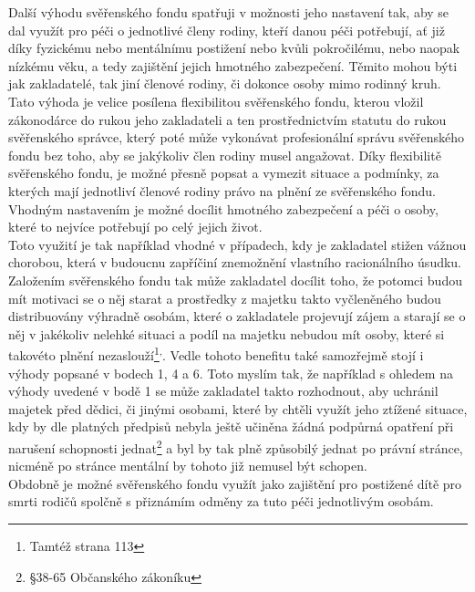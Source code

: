 \documentclass{article}
\begin{document}
 Další výhodu svěřenského fondu spatřuji v možnosti jeho nastavení tak, aby se dal využít pro péči o jednotlivé členy rodiny, kteří danou péči potřebují, ať již díky fyzickému nebo mentálnímu postižení nebo kvůli pokročilému, nebo naopak nízkému věku, a tedy zajištění jejich hmotného zabezpečení. Těmito mohou býti jak zakladatelé, tak jiní členové rodiny, či dokonce osoby mimo rodinný kruh. Tato výhoda je velice posílena flexibilitou svěřenského fondu, kterou vložil zákonodárce do rukou jeho zakladateli a ten prostřednictvím statutu do rukou svěřenského správce, který poté může vykonávat profesionální správu svěřenského fondu bez toho, aby se jakýkoliv člen rodiny musel angažovat. Díky flexibilitě svěřenského fondu, je možné přesně popsat a vymezit situace a podmínky, za kterých mají jednotliví členové rodiny právo na plnění ze svěřenského fondu. Vhodným nastavením je možné docílit hmotného zabezpečení a péči o osoby, které to nejvíce potřebují po celý jejich život.\\
 
 Toto využití je tak například vhodné v případech, kdy je zakladatel stižen vážnou chorobou, která v budoucnu zapříčiní znemožnění vlastního racionálního úsudku. Založením svěřenského fondu tak může zakladatel docílit toho, že potomci budou mít motivaci se o něj starat a prostředky z majetku takto vyčleněného budou distribuovány výhradně osobám, které o zakladatele projevují zájem a starají se o něj v jakékoliv nelehké situaci a podíl na majetku nebudou mít osoby, které si takovéto plnění nezaslouží\footnote{Tamtéž strana 113}\textsuperscript{,}. Vedle tohoto benefitu také samozřejmě stojí i výhody popsané v bodech 1, 4 a 6. Toto myslím tak, že například s ohledem na výhody uvedené v bodě 1 se může zakladatel takto rozhodnout, aby uchránil majetek před dědici, či jinými osobami, které by chtěli využít jeho ztížené situace, kdy by dle platných předpisů nebyla ještě učiněna žádná podpůrná opatření při narušení schopnosti jednat\footnote{§38-65 Občanského zákoníku} a byl by tak plně způsobilý jednat po právní stránce, nicméně po stránce mentální by tohoto již nemusel být schopen.\\
 
 Obdobně je možné svěřenského fondu využít jako zajištění pro postižené dítě pro smrti rodičů spolčně s přiznámím odměny za tuto péči jednotlivým osobám.
 
 
\end{document}
